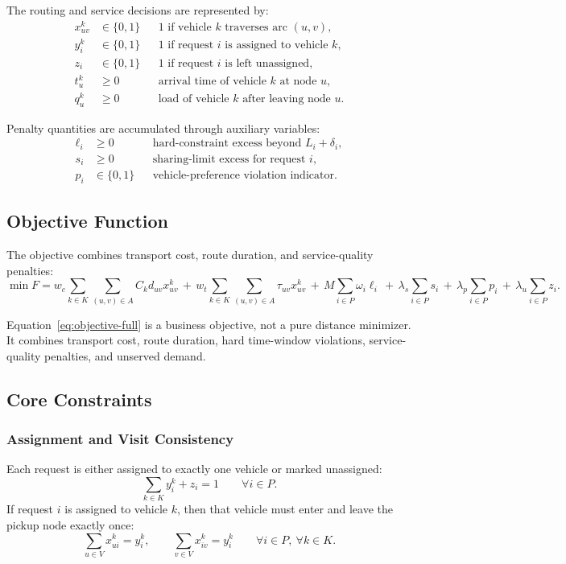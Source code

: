 \documentclass[11pt,a4paper]{article}
\begin{document}
The routing and service decisions are represented by:
\begin{align}
x_{uv}^k &\in \{0,1\} && \text{1 if vehicle $k$ traverses arc $(u,v)$,} \\
y_i^k &\in \{0,1\} && \text{1 if request $i$ is assigned to vehicle $k$,} \\
z_i &\in \{0,1\} && \text{1 if request $i$ is left unassigned,} \\
t_u^k &\ge 0 && \text{arrival time of vehicle $k$ at node $u$,} \\
q_u^k &\ge 0 && \text{load of vehicle $k$ after leaving node $u$.}
\end{align}

Penalty quantities are accumulated through auxiliary variables:
\begin{align}
\ell_i &\ge 0 && \text{hard-constraint excess beyond }L_i+\delta_i, \\
s_i &\ge 0 && \text{sharing-limit excess for request }i, \\
p_i &\in \{0,1\} && \text{vehicle-preference violation indicator.}
\end{align}

\subsection{Objective Function}

The objective combines transport cost, route duration, and service-quality penalties:
\begin{equation}
\min F =
w_c \sum_{k\in K}\sum_{(u,v)\in A} C_k d_{uv}x_{uv}^k
\, + \,
w_t \sum_{k\in K}\sum_{(u,v)\in A} \tau_{uv}x_{uv}^k
\, + \,
M\sum_{i\in P}\omega_i \ell_i
\, + \,
\lambda_s\sum_{i\in P}s_i
\, + \,
\lambda_p\sum_{i\in P}p_i
\, + \,
\lambda_u\sum_{i\in P}z_i .
\label{eq:objective-full}
\end{equation}

Equation~\eqref{eq:objective-full} is a business objective, not a pure distance minimizer. It combines transport cost, route duration, hard time-window violations, service-quality penalties, and unserved demand.

\subsection{Core Constraints}

\subsubsection{Assignment and Visit Consistency}
Each request is either assigned to exactly one vehicle or marked unassigned:
\begin{equation}
\sum_{k\in K} y_i^k + z_i = 1
\qquad \forall i\in P .
\label{eq:assign}
\end{equation}
If request $i$ is assigned to vehicle $k$, then that vehicle must enter and leave the pickup node exactly once:
\begin{equation}
\sum_{u\in V} x_{ui}^k = y_i^k,
\qquad
\sum_{v\in V} x_{iv}^k = y_i^k
\qquad \forall i\in P,\ \forall k\in K .
\label{eq:visit-link}
\end{equation}
\end{document}
